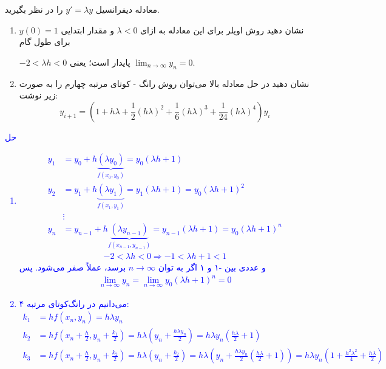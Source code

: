 معادله دیفرانسیل
$y' = \lambda y$
را در نظر بگیرید.
\begin{enumerate}
    \item 
    نشان دهید روش اویلر برای این معادله به ازای
    $\lambda < 0$ و مقدار ابتدایی 
    $y(0) = 1$
    برای طول گام
    
    $-2 < \lambda h < 0$
    پایدار است؛ یعنی
    $\lim_{{n \to \infty}} y_n = 0$.
    \item 
    نشان دهید در حل معادله بالا می‌توان روش رانگ - کوتای مرتبه چهارم را به صورت زیر نوشت:
    \[y_{i+1} = (1 + h\lambda + \frac{1}{2}(h\lambda)^2 + \frac{1}{6}(h\lambda)^3 + \frac{1}{24}(h\lambda)^4)y_i\]
\end{enumerate}
\textcolor{blue}{حل
\begin{enumerate}
    \item 
    \begin{align*}
        y_1 &= y_0 + h\underbrace{(\lambda y_0)}_{f(x_0,y_0)} = y_0 (\lambda h + 1) \\
        y_2 &= y_1 + h \underbrace{(\lambda y_1)}_{f(x_1,y_1)} = y_1 (\lambda h + 1) = y_0 (\lambda h + 1)^2 \\
        &\vdots \\
        y_n &= y_{n - 1} + h\underbrace{(\lambda y_{n - 1})}_{f(x_{n - 1}, y_{n - 1})} = y_{n - 1}(\lambda h + 1) = y_0 (\lambda h + 1)^n
    \end{align*}
    \begin{align*}
        -2 < \lambda h < 0 \Rightarrow -1 < \lambda h + 1 < 1
    \end{align*}
    و عددی بین 
    -۱ و 
    ۱ اگر به توان
    $n \rightarrow \infty$
    برسد، عملاً صفر می‌شود. پس
    \begin{align*}
        \lim_{n \to \infty} y_n = \lim_{n \to \infty} y_0 (\lambda h  + 1)^n= 0
    \end{align*}
    \item 
    می‌دانیم در رانگ‌کوتای مرتبه ۴:
    \begin{align*}
        k_1 &= hf(x_n,y_n) = h \lambda y_n \\
        k_2 &= hf(x_n + \frac{h}{2}, y_n + \frac{k_1}{2}) = h \lambda (y_n + \frac{h \lambda y_n}{2}) = h \lambda y_n (\frac{h \lambda}{2} + 1) \\
        k_3 &= hf(x_n + \frac{h}{2}, y_{n} + \frac{k_2}{2}) = h\lambda (y_n + \frac{k_2}{2}) = h \lambda (y_n + \frac{h \lambda y_n}{2} (\frac{h \lambda }{2} + 1)) = h \lambda y_n (1 + \frac{h^2 \lambda^2}{4} + \frac{h \lambda}{2}) \\

\end{align*}
\end{enumerate}}
